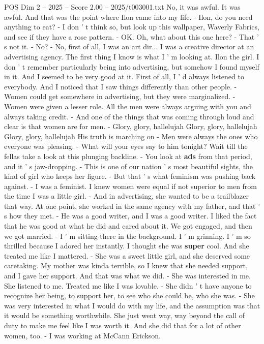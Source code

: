 \begin{textsample}{POS Dim 2 – 2025 – Score 2.00 – 2025/t003001.txt}
No, it was awful.
It was awful.
And that was the point where Ilon came into my life. - Ilon, do you need anything to eat? - I don ' t think so, but look up this wallpaper, Waverly Fabrics, and see if they have a rose pattern. - OK.
Oh, what about this one here? - That ' s not it. - No? - No, first of all, I was an art dir...
I was a creative director at an advertising agency.
The first thing I know is what I ' m looking at.
Ilon the girl.
I don ' t remember particularly being into advertising, but somehow I found myself in it.
And I seemed to be very good at it.
First of all, I ' d always listened to everybody.
And I noticed that I saw things differently than other people. - Women could get somewhere in advertising, but they were marginalized. - Women were given a lesser role.
All the men were always arguing with you and always taking credit. - And one of the things that was coming through loud and clear is that women are for men. - Glory, glory, hallelujah Glory, glory, hallelujah Glory, glory, hallelujah His truth is marching on - Men were always the ones who everyone was pleasing. - What will your eyes say to him tonight?
Wait till the fellas take a look at this plunging backline. - You look at \textbf{ads} from that period, and it ' s jaw-dropping. - This is one of our nation ' s most beautiful sights, the kind of girl who keeps her figure. - But that ' s what feminism was pushing back against. - I was a feminist.
I knew women were equal if not superior to men from the time I was a little girl. - And in advertising, she wanted to be a trailblazer that way.
At one point, she worked in the same agency with my father, and that ' s how they met. - He was a good writer, and I was a good writer.
I liked the fact that he was good at what he did and cared about it.
We got engaged, and then we got married. - I ' m sitting there in the background.
I ' m grinning.
I ' m so thrilled because I adored her instantly.
I thought she was \textbf{super} cool.
And she treated me like I mattered. - She was a sweet little girl, and she deserved some caretaking.
My mother was kinda terrible, so I knew that she needed support, and I gave her support.
And that was what we did. - She was interested in me.
She listened to me.
Treated me like I was lovable. - She didn ' t have anyone to recognize her being, to support her, to see who she could be, who she was. - She was very interested in what I would do with my life, and the assumption was that it would be something worthwhile.
She just went way, way beyond the call of duty to make me feel like I was worth it.
And she did that for a lot of other women, too. - I was working at McCann Erickson.

\end{textsample}

